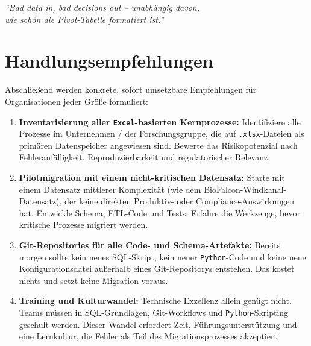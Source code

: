 ﻿\documentclass[12pt,a4paper]{report}
\theoremstyle{definition}
\theoremstyle{remark}
\newcommand{\excel}{\texttt{Excel}}
\newcommand{\py}{\texttt{Python}}
\newcommand{\code}[1]{\texttt{#1}}
\begin{document}
\bigskip
\begin{center}
  {\large\itshape
    ``Bad data in, bad decisions out -- unabhängig davon,\\
    wie schön die Pivot-Tabelle formatiert ist.''
  }
\end{center}

\section{Handlungsempfehlungen}

Abschließend werden konkrete, sofort umsetzbare Empfehlungen für
Organisationen jeder Größe formuliert:

\begin{enumerate}[leftmargin=1.5em, itemsep=5pt]
  \item \textbf{Inventarisierung aller \excel-basierten Kernprozesse:}
        Identifiziere alle Prozesse im Unternehmen / der Forschungsgruppe,
        die auf \code{.xlsx}-Dateien als primären Datenspeicher angewiesen
        sind. Bewerte das Risikopotenzial nach Fehleranfälligkeit,
        Reproduzierbarkeit und regulatorischer Relevanz.

  \item \textbf{Pilotmigration mit einem nicht-kritischen Datensatz:}
        Starte mit einem Datensatz mittlerer Komplexität (wie dem
        BioFalcon-Windkanal-Datensatz), der keine direkten Produktiv-
        oder Compliance-Auswirkungen hat.
        Entwickle Schema, ETL-Code und Tests.
        Erfahre die Werkzeuge, bevor kritische Prozesse migriert werden.

  \item \textbf{Git-Repositories für alle Code- und Schema-Artefakte:}
        Bereits morgen sollte kein neues SQL-Skript, kein neuer
        \py-Code und keine neue Konfigurationsdatei außerhalb eines
        Git-Repositorys entstehen.
        Das kostet nichts und setzt keine Migration voraus.

  \item \textbf{Training und Kulturwandel:}
        Technische Exzellenz allein genügt nicht.
        Teams müssen in SQL-Grundlagen, Git-Workflows und
        \py-Skripting geschult werden.
        Dieser Wandel erfordert Zeit, Führungsunterstützung und eine
        Lernkultur, die Fehler als Teil des Migrationsprozesses akzeptiert.


\end{enumerate}
\end{document}
